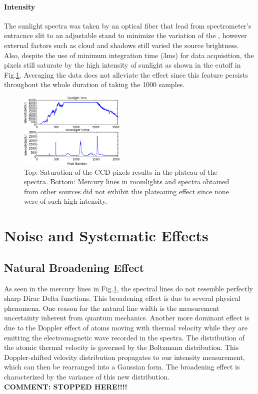 \documentclass[authoryear, 12pt,5p, times]{elsarticle}
\begin{document}
\paragraph*{\textbf{Intensity}}
The sunlight spectra was taken by an optical fiber that lead from spectrometer's entracnce slit to an adjustable stand to minimize the variation of the , however external factors such as cloud and shadows still varied the source brightness. Also,  despite the use of minimum integration time (3ms) for data acquisition,  the pixels still saturate by the high intensity of sunlight as shown in the cutoff in Fig.\ref{sunlight}. Averaging the data does not alleviate the effect since this feature persists throughout the whole duration of taking the 1000 samples. 
 \begin{figure}[h!]
	\includegraphics[width=0.45\textwidth]{figures/sunlight_saturated}
\caption{Top: Saturation of the CCD pixels results in the plateau of the spectra. Bottom: Mercury lines in roomlights and spectra obtained from other sources did not exhibit this plateauing effect since none were of such high intensity.}
\label{sunlight}
	\end{figure}
\section{Noise and Systematic Effects}
	 \subsection{Natural Broadening Effect}
 As seen in the mercury lines in Fig.\ref{sunlight}, the spectral lines do not resemble perfectly sharp Dirac Delta functions. This broadening effect is due to several physical phenomena. One reason for  the natural line width is the measurement uncertainty inherent from quantum mechanics. Another more dominant effect is due to the Doppler effect of atoms moving with thermal velocity while they are emitting the electromagnetic wave recorded in the spectra. The distribution of the atomic thermal velocity is governed by the Boltzmann distribution. This Doppler-shifted velocity distribution propagates to our intensity measurement, which can then be rearranged into a Gaussian form. The broadening effect is characterized by the variance of this new distribution.
 \\
\textbf{COMMENT: STOPPED HERE!!!!} 
\end{document}
